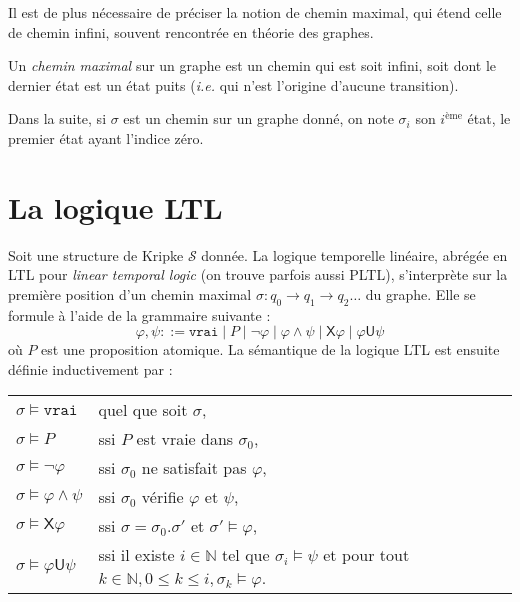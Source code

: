 Il est de plus nécessaire de préciser la notion de chemin maximal, qui étend celle de chemin infini, souvent rencontrée en théorie des graphes.
\begin{definition}
Un \emph{chemin maximal} sur un graphe est un chemin qui est soit infini, soit dont le dernier état est un état puits (\textit{i.e.} qui n'est l'origine d'aucune transition).
\end{definition}
Dans la suite, si $\sigma$ est un chemin sur un graphe donné, on note $\sigma_i$ son $i^\text{ème}$ état, le premier état ayant l'indice zéro.

\section{La logique LTL}
Soit une structure de Kripke $\mathcal{S}$ donnée. La logique temporelle linéaire, abrégée en LTL pour \textit{linear temporal logic} (on trouve parfois aussi PLTL), s'interprète sur la première position d'un chemin maximal $\sigma : q_0 \rightarrow q_1 \rightarrow q_2 \ldots$ du graphe. Elle se formule à l'aide de la grammaire suivante :
  $$\varphi, \psi ::= \texttt{vrai} \mid P \mid \neg \varphi \mid \varphi \wedge \psi \mid \textsf{X} \varphi \mid \varphi \textsf{U} \psi$$
où $P$ est une proposition atomique. La sémantique de la logique LTL est ensuite définie inductivement par :\\
\begin{tabular}{ll}
  $\sigma \models \texttt{vrai}$ & quel que soit $\sigma$,\\
  $\sigma \models P$ & ssi $P$ est vraie dans $\sigma_0$,\\
  $\sigma \models \neg \varphi$ & ssi $\sigma_0$ ne satisfait pas $\varphi$,\\
  $\sigma \models \varphi \wedge \psi$ & ssi $\sigma_0$ vérifie $\varphi$ et $\psi$,\\
  $\sigma \models \mathsf{X} \varphi$ & ssi $\sigma = \sigma_0.\sigma'$ et $\sigma' \models \varphi$,\\
  $\sigma \models \varphi \mathsf{U} \psi$ & ssi il existe $i \in \mathbb{N}$ tel que $\sigma_i \models \psi$ et pour tout $k \in \mathbb{N}, 0 \leq k \leq i, \sigma_k \models \varphi$.
\end{tabular}\\

